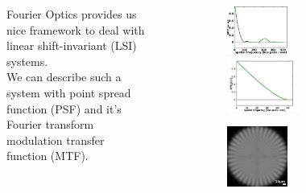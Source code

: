 \documentclass{beamer}
\begin{document}
\begin{frame}
	\begin{columns}
		\begin{column}{0.5\textwidth}
			\begin{figure}[htb]
			Fourier Optics provides us nice framework to deal with linear shift-invariant (LSI) systems. 
			\\	
			We can describe such a system with point spread function (PSF) and it's Fourier transform modulation transfer function (MTF). 
			\\
			\end{figure}
		\end{column}
		\begin{column}{0.5\textwidth}
			\begin{figure}[htb]
				\includegraphics[width=0.5\textwidth]{images/MTF-example.png}
				\includegraphics[width=0.6\textwidth]{images/MTF-perfect.png}
			\end{figure}
			\begin{figure}[htb]
				\includegraphics[width=0.5\textwidth]{images/Spoke.png}

\end{figure}
\end{column}
\end{columns}
\end{frame}
\end{document}
